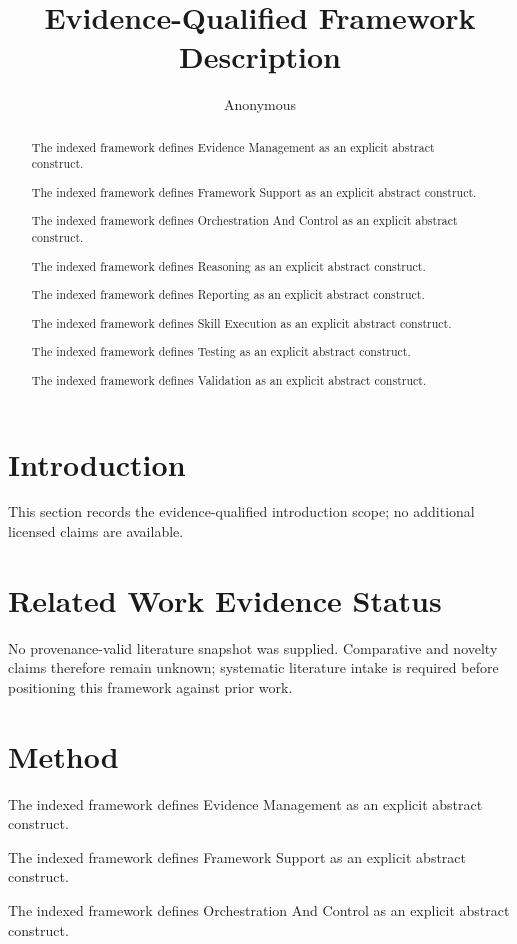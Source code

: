 \documentclass[11pt]{article}
\title{Evidence-Qualified Framework Description}
\author{Anonymous}
\date{}
\begin{document}
\maketitle
\begin{abstract}
The indexed framework defines Evidence Management as an explicit abstract construct.

The indexed framework defines Framework Support as an explicit abstract construct.

The indexed framework defines Orchestration And Control as an explicit abstract construct.

The indexed framework defines Reasoning as an explicit abstract construct.

The indexed framework defines Reporting as an explicit abstract construct.

The indexed framework defines Skill Execution as an explicit abstract construct.

The indexed framework defines Testing as an explicit abstract construct.

The indexed framework defines Validation as an explicit abstract construct.
\end{abstract}

\section{Introduction}

This section records the evidence-qualified introduction scope; no additional licensed claims are available.

\section{Related Work Evidence Status}

No provenance-valid literature snapshot was supplied. Comparative and novelty claims therefore remain unknown; systematic literature intake is required before positioning this framework against prior work.

\section{Method}

The indexed framework defines Evidence Management as an explicit abstract construct.

The indexed framework defines Framework Support as an explicit abstract construct.

The indexed framework defines Orchestration And Control as an explicit abstract construct.
\end{document}
